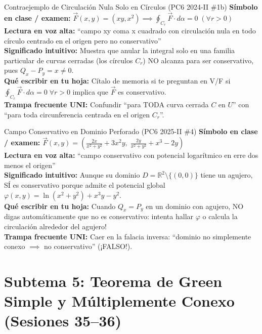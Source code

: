 \documentclass[11pt,a4paper]{article}
\begin{document}
\begin{definicionbox}{Contraejemplo de Circulación Nula Solo en Círculos (PC6 2024-II \#1b)}
\textbf{Símbolo en clase / examen:} $\vec{F}(x,y) = (xy, x^2) \implies \oint_{C_r} \vec{F}\cdot d\alpha = 0\; (\forall r > 0)$\\[0.15cm]
\textbf{Lectura en voz alta:} ``campo xy coma x cuadrado con circulación nula en todo círculo centrado en el origen pero no conservativo''\\[0.12cm]
\textbf{Significado intuitivo:} Muestra que anular la integral solo en una familia particular de curvas cerradas (los círculos $C_r$) NO alcanza para ser conservativo, pues $Q_x - P_y = x \neq 0$.\\[0.12cm]
\textbf{Qué escribir en tu hoja:} Cítalo de memoria si te preguntan en V/F si $\oint_{C_r} \vec{F}\cdot d\alpha = 0\; \forall r > 0$ implica que $\vec{F}$ es conservativo.\\[0.12cm]
\textbf{Trampa frecuente UNI:} Confundir ``para TODA curva cerrada $C$ en $U$'' con ``para toda circunferencia centrada en el origen $C_r$''.
\end{definicionbox}

\begin{definicionbox}{Campo Conservativo en Dominio Perforado (PC6 2025-II \#4)}
\textbf{Símbolo en clase / examen:} $\vec{F}(x,y) = \left(\frac{2x}{x^2+y^2} + 3x^2y,\; \frac{2y}{x^2+y^2} + x^3 - 2y\right)$\\[0.15cm]
\textbf{Lectura en voz alta:} ``campo conservativo con potencial logarítmico en erre dos menos el origen''\\[0.12cm]
\textbf{Significado intuitivo:} Aunque su dominio $D = \mathbb{R}^2 \setminus \{(0,0)\}$ tiene un agujero, SÍ es conservativo porque admite el potencial global $\varphi(x,y) = \ln(x^2+y^2) + x^3 y - y^2$.\\[0.12cm]
\textbf{Qué escribir en tu hoja:} Cuando $Q_x = P_y$ en un dominio con agujero, NO digas automáticamente que no es conservativo: intenta hallar $\varphi$ o calcula la circulación alrededor del agujero!\\[0.12cm]
\textbf{Trampa frecuente UNI:} Caer en la falacia inversa: ``dominio no simplemente conexo $\implies$ no conservativo'' (¡FALSO!).
\end{definicionbox}

\section{Subtema 5: Teorema de Green Simple y Múltiplemente Conexo (Sesiones 35--36)}
\end{document}

